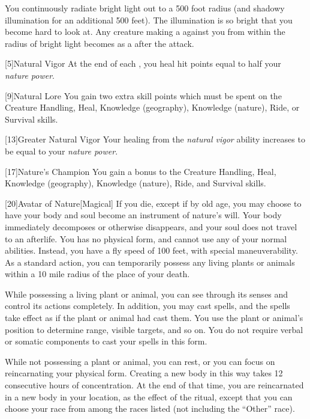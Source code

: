         You continuously radiate bright light out to a 500 foot radius (and shadowy illumination for an additional 500 feet).
        The illumination is so bright that you become hard to look at.
        Any creature making a  against you from within the radius of bright light becomes \dazzled as a  after the attack.

        [5]{Natural Vigor}
        At the end of each , you heal hit points equal to half your \textit{nature power}.

        [9]{Natural Lore}
        You gain two extra skill points which must be spent on the Creature Handling, Heal, Knowledge (geography), Knowledge (nature), Ride, or Survival skills.

        [13]{Greater Natural Vigor}
        Your healing from the \textit{natural vigor} ability increases to be equal to your \textit{nature power}.

        [17]{Nature's Champion}
        You gain a  bonus to the Creature Handling, Heal, Knowledge (geography), Knowledge (nature), Ride, and Survival skills.

        [20]{Avatar of Nature}[Magical]
        If you die, except if by old age, you may choose to have your body and soul become an instrument of nature's will.
        Your body immediately decomposes or otherwise disappears, and your soul does not travel to an afterlife.
        You has no physical form, and cannot use any of your normal abilities.
        Instead, you have a fly speed of 100 feet, with special maneuverability.
        As a standard action, you can temporarily possess any living plants or animals within a 10 mile radius of the place of your death.

        While possessing a living plant or animal, you can see through its senses and control its actions completely.
        In addition, you may cast spells, and the spells take effect as if the plant or animal had cast them.
        You use the plant or animal's position to determine range, visible targets, and so on.
        You do not require verbal or somatic components to cast your spells in this form.

        While not possessing a plant or animal, you can rest, or you can focus on reincarnating your physical form.
        Creating a new body in this way takes 12 consecutive hours of concentration.
        At the end of that time, you are reincarnated in a new body in your location, as the effect of the  ritual, except that you can choose your race from among the races listed (not including the ``Other'' race).

